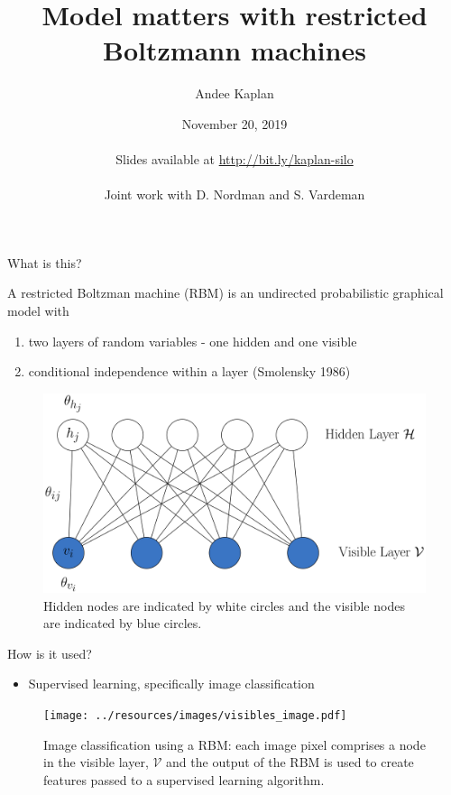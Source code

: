 \documentclass[ignorenonframetext,]{beamer}
\title[Model matters with RBMs]{Model matters with restricted Boltzmann machines}
\author[\href{mailto:andee.kaplan@colostate.edu}{\nolinkurl{andee.kaplan@colostate.edu}}]{Andee Kaplan}
\institute[]{Colorado State University\\
\href{mailto:andee.kaplan@colostate.edu}{\nolinkurl{andee.kaplan@colostate.edu}}}
\date[November 20, 2019]{November 20, 2019\\
~\\
Slides available at \url{http://bit.ly/kaplan-silo}\\
~\\
\footnotesize Joint work with D. Nordman and S. Vardeman}
\providecommand{\tightlist}{%
  \setlength{\itemsep}{0pt}\setlength{\parskip}{0pt}}
\theoremstyle{definition}
\begin{document}
\frame{\titlepage}

\begin{frame}{What is this?}
\protect\hypertarget{what-is-this}{}

A restricted Boltzman machine (RBM) is an undirected probabilistic
graphical model with

\begin{enumerate}
\tightlist
\item
  two layers of random variables - one hidden and one visible
\item
  conditional independence within a layer (Smolensky 1986)
\end{enumerate}

\begin{figure}
\includegraphics[width=.6\linewidth]{../resources/images/rbm.png}
\caption{Hidden nodes are indicated by white circles and the visible nodes are indicated by blue circles.}
\end{figure}

\end{frame}

\begin{frame}{How is it used?}
\protect\hypertarget{how-is-it-used}{}

\begin{itemize}
\tightlist
\item
  Supervised learning, specifically image classification
\end{itemize}

\begin{figure}
\texttt{[image: ../resources/images/visibles\_image.pdf]}
\caption{Image classification using a RBM: each image pixel comprises a node in the visible layer, $\mathcal{V}$ and the output of the RBM is used to create features passed to a supervised learning algorithm.}
\end{figure}

\end{frame}
\end{document}
